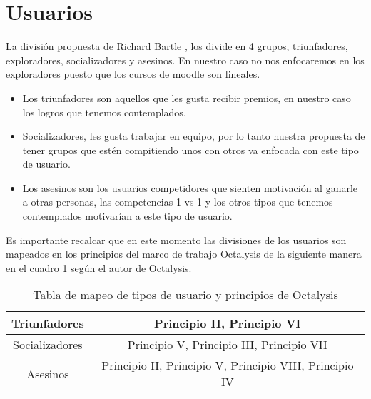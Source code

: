 \section{Usuarios}
\label{analisis:usuarios}


 La división propuesta de Richard Bartle \cite{TiposDeUsuario}, los divide en 4 grupos, triunfadores,
 exploradores, socializadores y asesinos. En nuestro caso no nos enfocaremos en los exploradores
 puesto que los cursos de moodle son lineales.
    
    \begin{itemize}
    \item Los triunfadores son aquellos que les gusta recibir premios, en nuestro caso
          los logros que tenemos contemplados.

    \item Socializadores, les gusta trabajar en equipo, por lo tanto nuestra propuesta
          de tener grupos que estén compitiendo unos con otros va enfocada con este tipo
          de usuario.

    \item Los asesinos son los usuarios competidores que sienten motivación al ganarle
          a otras personas, las competencias 1 vs 1 y los otros tipos que tenemos
          contemplados motivarían a este tipo de usuario.
    \end{itemize}
    
 Es importante recalcar que en este momento las divisiones de los usuarios son mapeados en los principios
 del marco de trabajo Octalysis de la siguiente manera en el cuadro \ref{table:usuariosvprincipios} según
 el autor de Octalysis\cite[p. 414]{libro2}.
    
    \begin{table}[h!]
    \centering
    \begin{tabular}{|c|c|} \hline
        Triunfadores & Principio II, Principio VI \\ \hline
        Socializadores &  Principio V, Principio III, Principio VII\\\hline
        Asesinos & Principio II, Principio V, Principio VIII, Principio IV \\\hline
    \end{tabular}
    \caption{Tabla de mapeo de tipos de usuario y principios de Octalysis}
    \label{table:usuariosvprincipios}
    \end{table}

